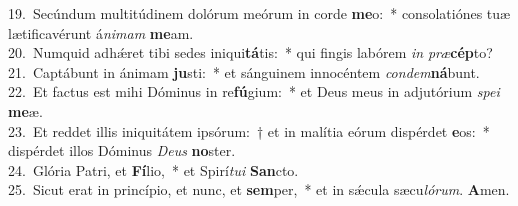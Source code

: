 {19.~}Secúndum multitúdinem dolórum meórum in corde \textbf{me}o:~* consolatiónes tuæ lætificavérunt á\textit{ni}\textit{mam} \textbf{me}am.\\
{20.~}Numquid adhǽret tibi sedes iniqui\textbf{tá}tis:~* qui fingis labórem \textit{in} \textit{præ}\textbf{cép}to?\\
{21.~}Captábunt in ánimam \textbf{ju}sti:~* et sánguinem innocéntem \textit{con}\textit{dem}\textbf{ná}bunt.\\
{22.~}Et factus est mihi Dóminus in re\textbf{fú}gium:~* et Deus meus in adjutórium \textit{spe}\textit{i} \textbf{me}æ.\\
{23.~}Et reddet illis iniquitátem ipsórum:~† et in malítia eórum dispérdet \textbf{e}os:~* dispérdet illos Dóminus \textit{De}\textit{us} \textbf{no}ster.\\
{24.~}Glória Patri, et \textbf{Fí}lio,~* et Spirí\textit{tu}\textit{i} \textbf{San}cto.\\
{25.~}Sicut erat in princípio, et nunc, et \textbf{sem}per,~* et in sǽcula sæcu\textit{ló}\textit{rum}. \textbf{A}men.\\
